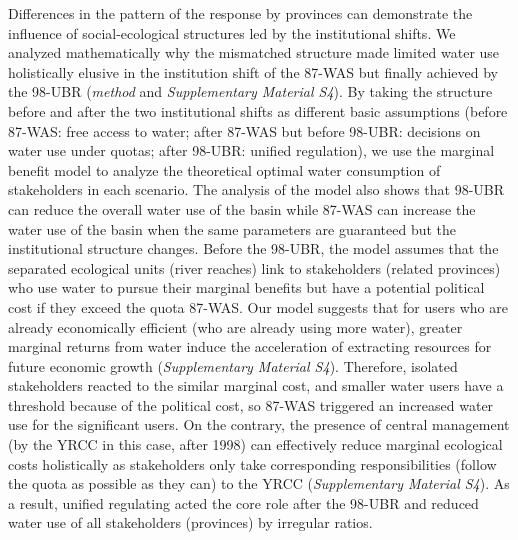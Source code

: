 \label{discussion-2}
Differences in the pattern of the response by provinces can demonstrate the influence of social-ecological structures led by the institutional shifts.
We analyzed mathematically why the mismatched structure made limited water use holistically elusive in the institution shift of the 87-WAS but finally achieved by the 98-UBR (\textit{method} and \textit{Supplementary Material S4}).
By taking the structure before and after the two institutional shifts as different basic assumptions (before 87-WAS: free access to water; after 87-WAS but before 98-UBR: decisions on water use under quotas; after 98-UBR: unified regulation), we use the marginal benefit model to analyze the theoretical optimal water consumption of stakeholders in each scenario.
The analysis of the model also shows that 98-UBR can reduce the overall water use of the basin while 87-WAS can increase the water use of the basin when the same parameters are guaranteed but the institutional structure changes.
Before the 98-UBR, the model assumes that the separated ecological units (river reaches) link to stakeholders (related provinces) who use water to pursue their marginal benefits but have a potential political cost if they exceed the quota 87-WAS.
Our model suggests that for users who are already economically efficient (who are already using more water), greater marginal returns from water induce the acceleration of extracting resources for future economic growth (\textit{Supplementary Material S4}).
Therefore, isolated stakeholders reacted to the similar marginal cost, and smaller water users have a threshold because of the political cost, so 87-WAS triggered an increased water use for the significant users.
On the contrary, the presence of central management (by the YRCC in this case, after 1998) can effectively reduce marginal ecological costs holistically as stakeholders only take corresponding responsibilities (follow the quota as possible as they can) to the YRCC (\textit{Supplementary Material S4}).
As a result, unified regulating acted the core role after the 98-UBR and reduced water use of all stakeholders (provinces) by irregular ratios.

